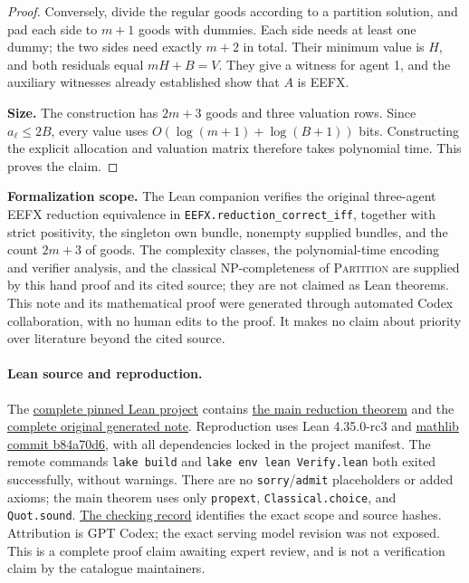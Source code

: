 \documentclass[11pt]{article}
\begin{document}
\begin{proof}
Conversely, divide the regular goods according to a partition solution,
and pad each side to $m+1$ goods with dummies. Each side needs at least
one dummy; the two sides need exactly $m+2$ in total. Their minimum
value is $H$, and both residuals equal $mH+B=V$. They give a witness
for agent 1, and the auxiliary witnesses already established show that
$A$ is EEFX.

\textbf{Size.}
The construction has $2m+3$ goods and three valuation rows.
Since $a_\ell\leq2B$, every value uses
$O(\log(m+1)+\log(B+1))$ bits. Constructing the explicit allocation and
valuation matrix therefore takes polynomial time. This proves the claim.
\end{proof}

\textbf{Formalization scope.}
The Lean companion verifies the original three-agent EEFX reduction
equivalence in \texttt{EEFX.reduction\_correct\_iff}, together with
strict positivity, the singleton own bundle, nonempty supplied bundles,
and the count $2m+3$ of goods. The complexity classes, the polynomial-time
encoding and verifier analysis, and the classical NP-completeness of
\textsc{Partition} are supplied by this hand proof and its cited source;
they are not claimed as Lean theorems.
This note and its mathematical proof were generated through automated
Codex collaboration, with no human edits to the proof. It makes no
claim about priority over literature beyond the cited source.

\paragraph{Lean source and reproduction.}
The \href{https://github.com/jbaelaw/eefx-recognition-lean/tree/fffcf03e8bb948982d058275f87c9b80c3f13324}{complete pinned Lean project}
contains \href{https://github.com/jbaelaw/eefx-recognition-lean/blob/fffcf03e8bb948982d058275f87c9b80c3f13324/EEFX/Reduction.lean}{the main reduction theorem}
and the \href{https://github.com/jbaelaw/eefx-recognition-lean/blob/fffcf03e8bb948982d058275f87c9b80c3f13324/original/initial-research-note.tex}{complete original generated note}.
Reproduction uses Lean 4.35.0-rc3 and
\href{https://github.com/leanprover-community/mathlib4/tree/b84a70d6a5ed793cc46184160f4d4188d8c825fb}{mathlib commit b84a70d6},
with all dependencies locked in the project manifest.
The remote commands \texttt{lake build} and \texttt{lake env lean Verify.lean}
both exited successfully, without warnings. There are no
\texttt{sorry}/\texttt{admit} placeholders or added axioms;
the main theorem uses only \texttt{propext}, \texttt{Classical.choice},
and \texttt{Quot.sound}.
\href{https://github.com/jbaelaw/eefx-recognition-lean/blob/fffcf03e8bb948982d058275f87c9b80c3f13324/verification/LeanVerification.json}{The checking record}
identifies the exact scope and source hashes. Attribution is GPT Codex;
the exact serving model revision was not exposed. This is a complete
proof claim awaiting expert review, and is not a verification claim
by the catalogue maintainers.
\end{document}
